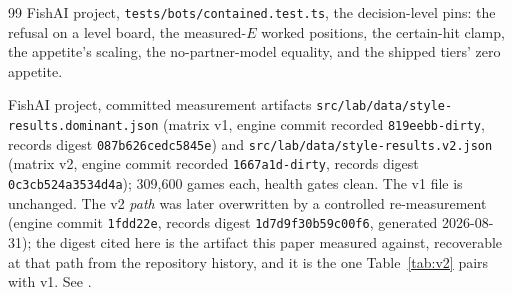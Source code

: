\documentclass[11pt]{article}
\newcommand{\code}[1]{\texttt{#1}}
\begin{document}
\begin{thebibliography}{99}
FishAI project,
\code{tests/bots/contained.test.ts},
the decision-level pins: the refusal on a level board, the measured-$E$
worked positions, the certain-hit clamp, the appetite's scaling, the
no-partner-model equality, and the shipped tiers' zero appetite.

FishAI project,
committed measurement artifacts
\code{src/lab/data/style-results.dominant.json} (matrix v1, engine commit
recorded \code{819eebb-dirty}, records digest \code{087b626cedc5845e}) and
\code{src/lab/data/style-results.v2.json} (matrix v2, engine commit
recorded \code{1667a1d-dirty}, records digest \code{0c3cb524a3534d4a});
309{,}600 games each, health gates clean. The v1 file is unchanged. The v2
\emph{path} was later overwritten by a controlled re-measurement (engine
commit \code{1fdd22e}, records digest \code{1d7d9f30b59c00f6}, generated
2026-08-31); the digest cited here is the artifact this paper measured
against, recoverable at that path from the repository history, and it is the
one Table~\ref{tab:v2} pairs with v1. See \cite{v05}.

\end{thebibliography}
\end{document}
